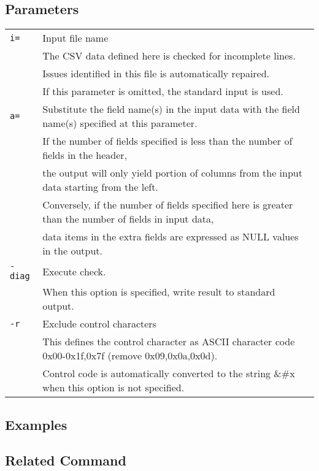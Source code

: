 \subsection*{Parameters}
\begin{table}[htbp]
{\small
\begin{tabular}{ll}
\verb|i=|    & Input file name\\
             & The CSV data defined here is checked for incomplete lines. \\
             & Issues identified in this file is automatically repaired. \\
             & If this parameter is omitted, the standard input is used. \\
\verb|a=|   & Substitute the field name(s) in the input data with the field name(s) specified at this parameter.\\
		& If the number of fields specified is less than the number of fields in the header, \\
		& the output will only yield portion of columns from the input data starting from the left. \\
		& Conversely, if the number of fields specified here is greater than the number of fields in input data, \\
		& data items in the extra fields are expressed as NULL values in the output.\\
\verb|-diag| & Execute check. \\
             & When this option is specified, write result to standard output.\\
\verb|-r|    & Exclude control characters\\
             & This defines the control character as ASCII character code 0x00-0x1f,0x7f (remove 0x09,0x0a,0x0d).\\
             & Control code is automatically converted to the string \&\#x when this option is not specified. \\\end{tabular} 
}
\end{table} 

\subsection*{Examples}


\subsection*{Related Command}

%

